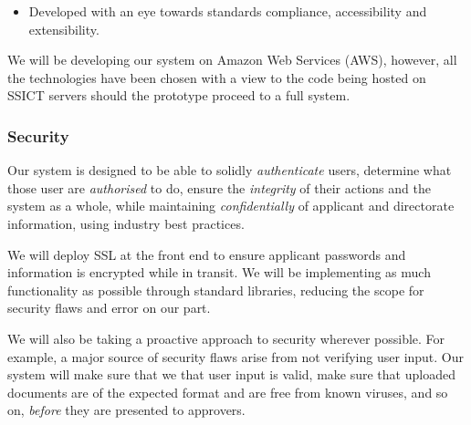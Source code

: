 \documentclass[12pt,a4paper,twosided]{article}
\begin{document}
\begin{itemize}
  \begin{itemize}
  \itemsep1pt\parskip0pt
  \item
    Developed with an eye towards standards compliance, accessibility
    and extensibility.
  \end{itemize}
\end{itemize}

We will be developing our system on Amazon Web Services (AWS), however,
all the technologies have been chosen with a view to the code being
hosted on SSICT servers should the prototype proceed to a full system.

\subsubsection{Security}\label{security}

Our system is designed to be able to solidly \emph{authenticate} users,
determine what those user are \emph{authorised} to do, ensure the
\emph{integrity} of their actions and the system as a whole, while
maintaining \emph{confidentially} of applicant and directorate
information, using industry best practices.

We will deploy SSL at the front end to ensure applicant passwords and
information is encrypted while in transit. We will be implementing as
much functionality as possible through standard libraries, reducing the
scope for security flaws and error on our part.

We will also be taking a proactive approach to security wherever
possible. For example, a major source of security flaws arise from not
verifying user input. Our system will make sure that we that user input
is valid, make sure that uploaded documents are of the expected format
and are free from known viruses, and so on, \emph{before} they are
presented to approvers.
\end{document}
